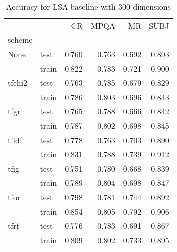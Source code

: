 \begin{table}[H]
\begin{center}

\begin{tabular}{llrrrr}
\toprule
{} &      &  CR &  MPQA &  MR &  SUBJ \\
scheme &  &            &              &            &              \\
\midrule
None & test &      0.760 &        0.763 &      0.692 &        0.893 \\
{} & train &      0.822 &        0.783 &      0.721 &        0.900 \\
tfchi2 & test &      0.763 &        0.785 &      0.679 &        0.829 \\
{} & train &      0.786 &        0.803 &      0.696 &        0.843 \\
tfgr & test &      0.765 &        0.788 &      0.666 &        0.842 \\
{} & train &      0.787 &        0.802 &      0.698 &        0.845 \\
tfidf & test &      0.778 &        0.763 &      0.703 &        0.890 \\
{} & train &      0.831 &        0.788 &      0.739 &        0.912 \\
tfig & test &      0.751 &        0.780 &      0.668 &        0.839 \\
{} & train &      0.789 &        0.804 &      0.698 &        0.847 \\
tfor & test &      0.798 &        0.781 &      0.744 &        0.892 \\
{} & train &      0.854 &        0.805 &      0.792 &        0.906 \\
tfrf & test &      0.776 &        0.783 &      0.691 &        0.867 \\
{} & train &      0.809 &        0.802 &      0.733 &        0.895 \\
\bottomrule
\end{tabular}

\caption[Accuracy for LSA baseline with 300 dimensions]{Accuracy for LSA baseline with 300 dimensions}
\label{tab:lsa:resuts:abs:300}
\end{center}
\end{table}





